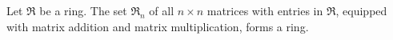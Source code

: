Let $\Re$ be a ring. The set $\Re_n$ of all $n \times n$ matrices with entries in $\Re$, equipped with matrix addition and matrix multiplication, forms a ring.
